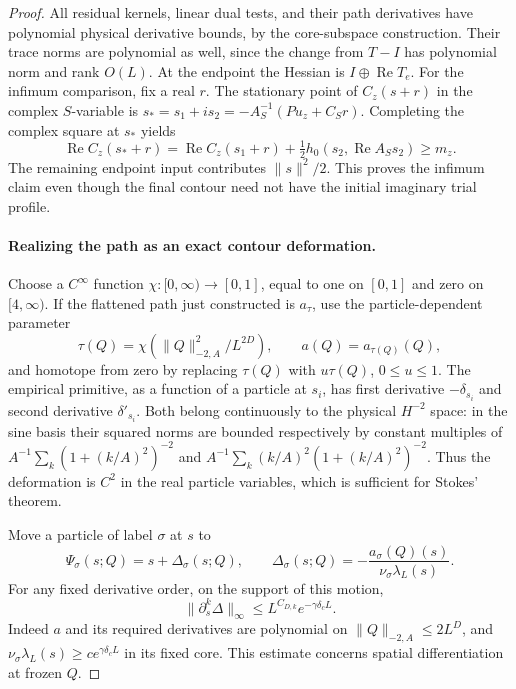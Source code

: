 \begin{proof}
All residual kernels, linear dual tests, and their path derivatives
have polynomial physical derivative bounds, by the core-subspace
construction. Their trace norms are polynomial as well, since the
change from \(T-I\) has polynomial norm and rank \(O(L)\). At the
endpoint the Hessian is \(I\oplus\operatorname{Re}T_e\).
For the infimum comparison, fix a real \(r\). The stationary point of
\(C_z(s+r)\) in the complex \(S\)-variable is
\(s_*=s_1+is_2=-A_S^{-1}(Pu_z+C_Sr)\). Completing the complex square
at \(s_*\) yields
\[
 \operatorname{Re}C_z(s_*+r)
 =\operatorname{Re}C_z(s_1+r)
       +\tfrac12h_0(s_2,\operatorname{Re}A_Ss_2)
 \ge m_z.
\]
The remaining endpoint input contributes \(\|s\|^2/2\). This proves
the infimum claim even though the final contour need not have the
initial imaginary trial profile.

\paragraph{Realizing the path as an exact contour deformation.}
Choose a \(C^\infty\) function \(\chi:[0,\infty)\to[0,1]\), equal
to one on \([0,1]\) and zero on \([4,\infty)\). If the flattened
path just constructed is \(a_\tau\), use the particle-dependent
parameter
\[
 \tau(Q)=\chi(\|Q\|_{-2,A}^2/L^{2D}),
 \qquad a(Q)=a_{\tau(Q)}(Q),
\]
and homotope from zero by replacing \(\tau(Q)\) with
\(u\tau(Q)\), \(0\le u\le1\). The empirical primitive, as a function
of a particle at \(s_i\), has first derivative \(-\delta_{s_i}\)
and second derivative \(\delta'_{s_i}\). Both belong continuously
to the physical \(H^{-2}\) space: in the sine basis their squared
norms are bounded respectively by constant multiples of
\(A^{-1}\sum_k(1+(k/A)^2)^{-2}\) and
\(A^{-1}\sum_k(k/A)^2(1+(k/A)^2)^{-2}\).
Thus the deformation is \(C^2\) in the real particle variables,
which is sufficient for Stokes' theorem.

Move a particle of label \(\sigma\) at \(s\) to
\[
 \Psi_\sigma(s;Q)=s+\Delta_\sigma(s;Q),\qquad
 \Delta_\sigma(s;Q)=-\frac{a_\sigma(Q)(s)}
                              {\nu_\sigma\lambda_L(s)}.
\]
For any fixed derivative order, on the support of this motion,
\[
 \|\partial_s^k\Delta\|_\infty
 \le L^{C_{D,k}}e^{-\gamma\delta_c L}.
\]
Indeed \(a\) and its required derivatives are polynomial on
\(\|Q\|_{-2,A}\le2L^D\), and
\(\nu_\sigma\lambda_L(s)\ge c e^{\gamma\delta_cL}\) in its fixed
core. This estimate concerns spatial differentiation at frozen \(Q\).


\end{proof}

